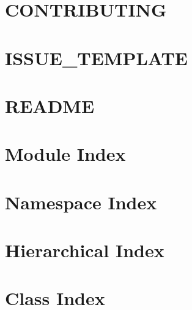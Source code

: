 \let\mypdfximage\pdfximage\def\pdfximage{\immediate\mypdfximage}\documentclass[twoside]{book}
\newcommand{\+}{\discretionary{\mbox{\scriptsize$\hookleftarrow$}}{}{}}
\begin{document}
\chapter{CONTRIBUTING}
\label{md__c___users_nouet__documents__cours_5_a__dev__p_r_d__prd_coprod__prd_coprod_libs_xlnt_1_5_0_th059c36e5413ea599662c7608908dd681}

\chapter{ISSUE\+\_\+\+TEMPLATE}
\label{md__c___users_nouet__documents__cours_5_a__dev__p_r_d__prd_coprod__prd_coprod_libs_xlnt_1_5_0_th6b133b864807bbe0ada7d5c89b1d6994}

\chapter{README}
\label{md__c___users_nouet__documents__cours_5_a__dev__p_r_d__prd_coprod__prd_coprod_libs_xlnt_1_5_0_third_party_pybind11__r_e_a_d_m_e}

\chapter{Module Index}

\chapter{Namespace Index}

\chapter{Hierarchical Index}

\chapter{Class Index}

\end{document}
